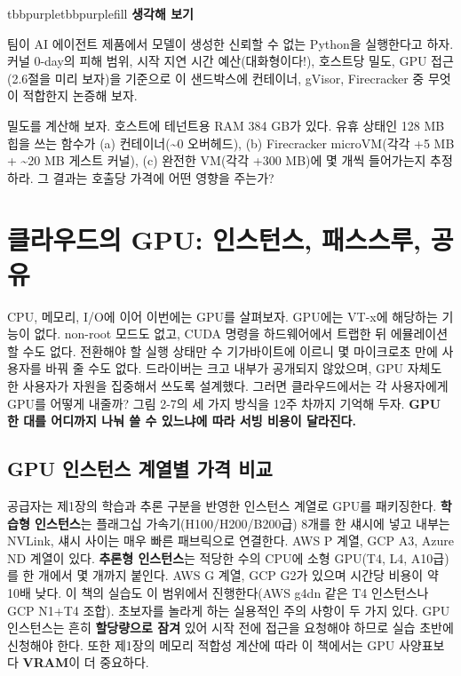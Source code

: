 \begin{calloutbox}{tbbpurple}{tbbpurplefill}
{\normalsize\bfseries\color{tbbpurple}생각해 보기}\par\vspace{3pt}
\begin{tbbitemize}
  \item 팀이 AI 에이전트 제품에서 모델이 생성한 신뢰할 수 없는 Python을 실행한다고 하자. 커널 0-day의 피해 범위, 시작 지연 시간 예산(대화형이다!), 호스트당 밀도, GPU 접근(2.6절을 미리 보자)을 기준으로 이 샌드박스에 컨테이너, gVisor, Firecracker 중 무엇이 적합한지 논증해 보자.
  \item 밀도를 계산해 보자. 호스트에 테넌트용 RAM 384 GB가 있다. 유휴 상태인 128 MB 힙을 쓰는 함수가 (a) 컨테이너(\textasciitilde{}0 오버헤드), (b) Firecracker microVM(각각 +5 MB + \textasciitilde{}20 MB 게스트 커널), (c) 완전한 VM(각각 +300 MB)에 몇 개씩 들어가는지 추정하라. 그 결과는 호출당 가격에 어떤 영향을 주는가?
\end{tbbitemize}
\end{calloutbox}

\section{클라우드의 GPU: 인스턴스, 패스스루, 공유}

CPU, 메모리, I/O에 이어 이번에는 GPU를 살펴보자. GPU에는 VT-x에 해당하는 기능이 없다. non-root 모드도 없고, CUDA 명령을 하드웨어에서 트랩한 뒤 에뮬레이션할 수도 없다. 전환해야 할 실행 상태만 수 기가바이트에 이르니 몇 마이크로초 만에 사용자를 바꿔 줄 수도 없다. 드라이버는 크고 내부가 공개되지 않았으며, GPU 자체도 한 사용자가 자원을 집중해서 쓰도록 설계했다. 그러면 클라우드에서는 각 사용자에게 GPU를 어떻게 내줄까? 그림 2-7의 세 가지 방식을 12주 차까지 기억해 두자. \textbf{GPU 한 대를 어디까지 나눠 쓸 수 있느냐에 따라 서빙 비용이 달라진다.}

\subsection*{GPU 인스턴스 계열별 가격 비교}

공급자는 제1장의 학습과 추론 구분을 반영한 인스턴스 계열로 GPU를 패키징한다. \textbf{학습형 인스턴스}는 플래그십 가속기(H100/H200/B200급) 8개를 한 섀시에 넣고 내부는 NVLink, 섀시 사이는 매우 빠른 패브릭으로 연결한다. AWS P 계열, GCP A3, Azure ND 계열이 있다. \textbf{추론형 인스턴스}는 적당한 수의 CPU에 소형 GPU(T4, L4, A10급)를 한 개에서 몇 개까지 붙인다. AWS G 계열, GCP G2가 있으며 시간당 비용이 약 10배 낮다. 이 책의 실습도 이 범위에서 진행한다(AWS g4dn 같은 T4 인스턴스나 GCP N1+T4 조합). 초보자를 놀라게 하는 실용적인 주의 사항이 두 가지 있다. GPU 인스턴스는 흔히 \textbf{할당량으로 잠겨} 있어 시작 전에 접근을 요청해야 하므로 실습 초반에 신청해야 한다. 또한 제1장의 메모리 적합성 계산에 따라 이 책에서는 GPU 사양표보다 \textbf{VRAM}이 더 중요하다.

